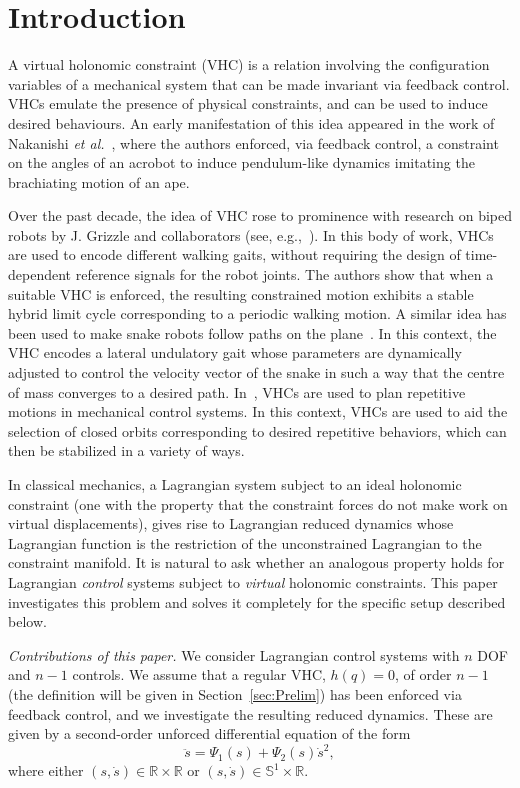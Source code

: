 \section*{Introduction}
A virtual holonomic constraint (VHC) is a relation involving the
configuration variables of a mechanical system that can be made
invariant via feedback control.  VHCs emulate the presence of physical
constraints, and can be used to induce desired behaviours.  An early
manifestation of this idea appeared in the work of Nakanishi {\em et
	al.}~\cite{nakanishi-2000}, where the authors enforced, via feedback
control, a constraint on the angles of an acrobot to induce
pendulum-like dynamics imitating the brachiating motion of an ape.

Over the past decade, the idea of VHC rose to prominence with research
on biped robots by J. Grizzle and collaborators (see,
e.g.,~\cite{PleGriWesAbb03,WesGriKod03,WesGriCheChoMor07,
	CheGriShi08}). In this body of work, VHCs are used to encode
different walking gaits, without requiring the design of
time-dependent reference signals for the robot joints. The authors
show that when a suitable VHC is enforced, the resulting constrained
motion exhibits a stable hybrid limit cycle corresponding to a periodic
walking motion.  A similar idea has been used to make snake robots
follow paths on the plane~\cite{mohammadi2014direction,
	mohammadi2015maneuver}. In this context, the VHC encodes a lateral
undulatory gait whose parameters are dynamically adjusted to control
the velocity vector of the snake in such a way that the centre of mass
converges to a desired path.
In~\cite{ShiPerWit05,ShiRobPerSan06,ShiFreGus10,FreRobShiJoh08}, VHCs
are used to plan repetitive motions in mechanical control systems. In
this context, VHCs are used to aid the selection of closed orbits
corresponding to desired repetitive behaviors, which can then be
stabilized in a variety of ways.

In classical mechanics, a Lagrangian system subject to an ideal
holonomic constraint (one with the property that the constraint forces
do not make work on virtual displacements), gives rise to Lagrangian
reduced dynamics whose Lagrangian function is the restriction of the
unconstrained Lagrangian to the constraint manifold.  It is natural to
ask whether an analogous property holds for Lagrangian {\em control}
systems subject to {\em virtual} holonomic constraints.  This paper
investigates this problem and solves it completely for the specific
setup described below.

{\em Contributions of this paper.}   We consider
Lagrangian control systems with $n$ DOF and $n-1$ controls. We assume
that a regular VHC, $h(q)=0$, of order $n-1$ (the definition will be
given in Section~\ref{sec:Prelim}) has been enforced via feedback
control, and we investigate the resulting reduced dynamics. These are
given by a second-order unforced differential equation of the form
\begin{equation}\label{eq:sys:0}
\ddot s = \Psi_1(s) + \Psi_2(s) \dot s^2,
\end{equation}
where either $(s,\dot s)\in \mathbb{R} \times \mathbb{R}$ or $(s,\dot s) \in \mathbb{S}^1
\times \mathbb{R}$.

